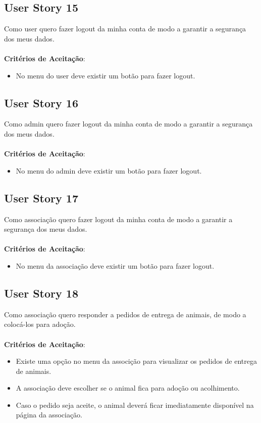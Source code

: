 \documentclass[a4paper,11pt]{article}
\begin{document}
\subsection{User Story 15}
Como user quero fazer logout da minha conta de modo a garantir a segurança dos meus dados.\\\\
\textbf{Critérios de Aceitação}:
\begin{itemize}
  \item No menu do user deve existir um botão para fazer logout.
\end{itemize}

\subsection{User Story 16}
Como admin quero fazer logout da minha conta de modo a garantir a segurança dos meus dados.\\\\
\textbf{Critérios de Aceitação}:
\begin{itemize}
  \item No menu do admin deve existir um botão para fazer logout.
\end{itemize}

\subsection{User Story 17}
Como associação quero fazer logout da minha conta de modo a garantir a segurança dos meus dados.\\\\
\textbf{Critérios de Aceitação}:
\begin{itemize}
  \item No menu da associação deve existir um botão para fazer logout.
\end{itemize}

\subsection{User Story 18}
Como associação quero responder a pedidos de entrega de animais, de modo a colocá-los para adoção.\\\\
\textbf{Critérios de Aceitação}:
\begin{itemize}
  \item Existe uma opção no menu da associção para visualizar os pedidos de entrega de animais.
  \item A associação deve escolher se o animal fica para adoção ou acolhimento.
  \item Caso o pedido seja aceite, o animal deverá ficar imediatamente disponível na página da associação.
\end{itemize}
\end{document}
